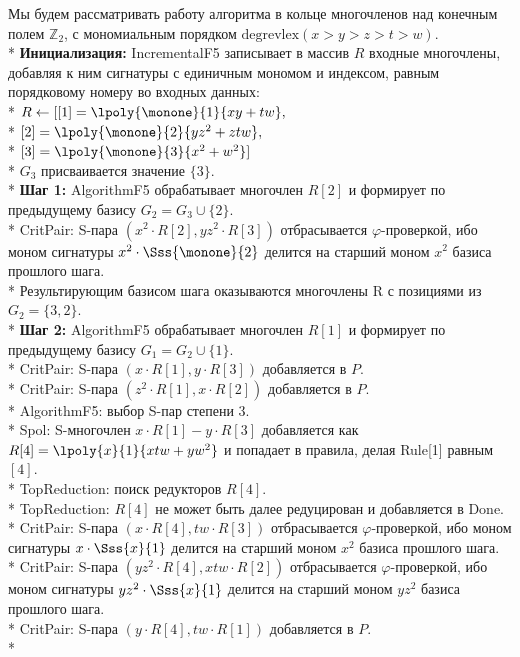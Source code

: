 Мы будем рассматривать работу алгоритма в кольце многочленов над конечным полем $\mathbb{Z}_{2}$, с мономиальным порядком $\mbox{degrevlex}(x>y>z>t>w)$.\\*
 \textbf{Инициализация:} IncrementalF5 записывает в массив $R$ входные многочлены, добавляя к ним сигнатуры с единичным мономом и индексом, равным порядковому номеру во входных данных:\\* $R\leftarrow[ [1]=\lpoly{\monone}{1}{xy+tw},$\\*
$[2]=\lpoly{\monone}{2}{yz^{2}+ztw},$\\*
$[3]=\lpoly{\monone}{3}{x^{2}+w^{2}}]$\\*
$G_3$ присваивается значение $\{3\}$.\\*
\textbf{Шаг 1:} AlgorithmF5 обрабатывает многочлен $R[2]$ и формирует по предыдущему базису $G_{2}=G_3\cup \{2\}$.\\*
CritPair: S-пара $(x^{2}\cdot R[2],yz^{2}\cdot R[3])$  отбрасывается $\varphi$-проверкой, ибо моном сигнатуры $x^{2}\cdot\Sss{\monone}{2}$ делится на старший моном $x^{2}$ базиса прошлого шага.\\*
Результирующим базисом шага оказываются многочлены R с позициями из $G_2=\{3, 2\}$.\\*
\textbf{Шаг 2:} AlgorithmF5 обрабатывает многочлен $R[1]$ и формирует по предыдущему базису $G_{1}=G_2\cup \{1\}$.\\*
CritPair: S-пара $(x\cdot R[1],y\cdot R[3])$ добавляется в $P$.\\*
CritPair: S-пара $(z^{2}\cdot R[1],x\cdot R[2])$ добавляется в $P$.\\*
AlgorithmF5: выбор S-пар степени 3.\\*
Spol: S-многочлен $x\cdot R[1] - y\cdot R[3]$ добавляется как $R[4]=\lpoly{x}{1}{xtw+yw^{2}}$ и попадает в правила, делая Rule[1] равным $[4]$.\\*
TopReduction: поиск редукторов $R[4]$.\\*
TopReduction: $R[4]$ не может быть далее редуцирован и добавляется в Done.\\*
CritPair: S-пара $(x\cdot R[4],tw\cdot R[3])$  отбрасывается $\varphi$-проверкой, ибо моном сигнатуры $x\cdot\Sss{x}{1}$ делится на старший моном $x^{2}$ базиса прошлого шага.\\*
CritPair: S-пара $(yz^{2}\cdot R[4],xtw\cdot R[2])$  отбрасывается $\varphi$-проверкой, ибо моном сигнатуры $yz^{2}\cdot\Sss{x}{1}$ делится на старший моном $yz^{2}$ базиса прошлого шага.\\*
CritPair: S-пара $(y\cdot R[4],tw\cdot R[1])$ добавляется в $P$.\\*
